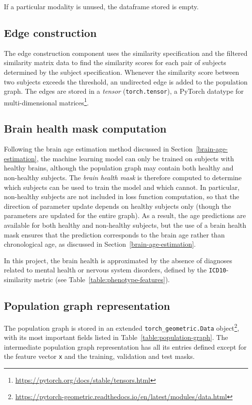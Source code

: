 If a particular modality is unused, the dataframe stored is empty.

\subsection{Edge construction}

The edge construction component uses the similarity specification and the filtered similarity matrix data to find the similarity scores for each pair of subjects determined by the subject specification. Whenever the similarity score between two subjects exceeds the threshold, an undirected edge is added to the population graph. The edges are stored in a \textit{tensor} (\texttt{torch.tensor}), a PyTorch datatype for multi-dimensional matrices\footnote{\url{https://pytorch.org/docs/stable/tensors.html}}.

\subsection{Brain health mask computation}

Following the brain age estimation method discussed in Section~\ref{brain-age-estimation}, the machine learning model can only be trained on subjects with healthy brains, although the population graph may contain both healthy and non-healthy subjects. The \textit{brain health mask} is therefore computed to determine which subjects can be used to train the model and which cannot. In particular, non-healthy subjects are not included in loss function computation, so that the direction of parameter update depends on healthy subjects only (though the parameters are updated for the entire graph). As a result, the age predictions are available for both healthy and non-healthy subjects, but the use of a brain health mask ensures that the prediction corresponds to the brain age rather than chronological age, as discussed in Section~\ref{brain-age-estimation}.

In this project, the brain health is approximated by the absence of diagnoses related to mental health or nervous system disorders, defined by the \texttt{ICD10}-similarity metric (see Table~\ref{table:phenotype-features}).

\subsection{Population graph representation}
\label{section:population-graph-representation}

The population graph is stored in an extended \texttt{torch\_geometric.Data} object\footnote{\url{https://pytorch-geometric.readthedocs.io/en/latest/modules/data.html}}, with its most important fields listed in Table~\ref{table:population-graph}. The intermediate population graph representation has all its entries defined except for the feature vector \texttt{x} and the training, validation and test masks.

